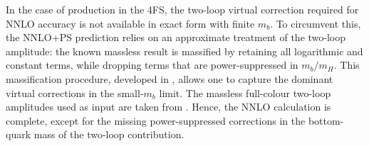 \documentclass[11pt,a4paper]{article}
\begin{document}
In the case of \bbH{} production in the 4FS, the two-loop virtual correction required for NNLO accuracy is not available in exact form with finite \(m_b\). To circumvent this, the NNLO+PS prediction relies on an approximate treatment of the two-loop amplitude: the known massless result is massified by retaining all logarithmic and constant terms, while dropping terms that are power-suppressed in \(m_b / m_{H}\). This massification procedure, developed in , allows one to capture the dominant virtual corrections in the small-\(m_b\) limit. The massless full-colour two-loop amplitudes used as input are taken from . Hence, the NNLO calculation is complete, except for the missing power-suppressed corrections in the bottom-quark mass of the two-loop contribution.
\end{document}
